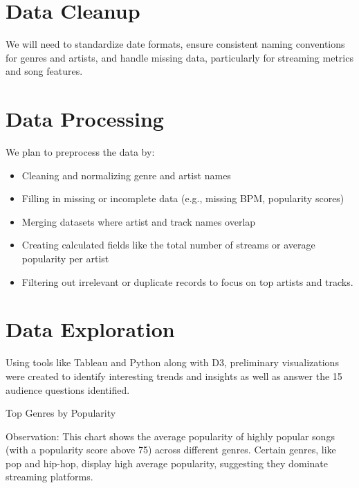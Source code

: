 \documentclass[12pt]{article}
\begin{document}
\section*{Data Cleanup}
We will need to standardize date formats, ensure consistent naming conventions for genres and artists, and handle missing data, particularly for streaming metrics and song features.

\section*{Data Processing}
We plan to preprocess the data by:

\begin{itemize}
  \item Cleaning and normalizing genre and artist names
  \item Filling in missing or incomplete data (e.g., missing BPM, popularity scores)
  \item Merging datasets where artist and track names overlap
  \item Creating calculated fields like the total number of streams or average popularity per artist
  \item Filtering out irrelevant or duplicate records to focus on top artists and tracks.
\end{itemize}

\section*{Data Exploration}
Using tools like Tableau and Python along with D3, preliminary visualizations were created to identify interesting trends and insights as well as answer the 15 audience questions identified.

Top Genres by Popularity\\


Observation: This chart shows the average popularity of highly popular songs (with a popularity score above 75) across different genres. Certain genres, like pop and hip-hop, display high average popularity, suggesting they dominate streaming platforms.
\end{document}
